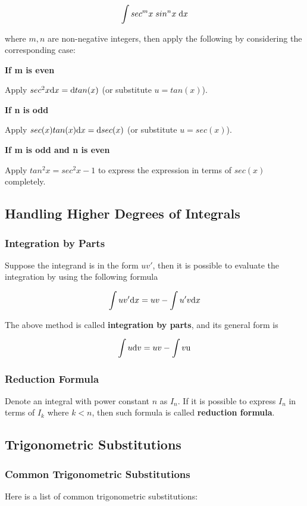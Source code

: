 \documentclass[a4paper,12pt]{article}
\begin{document}
$$\int sec^{m}x\; sin^{n}x\;\mathrm{d} x$$\s

where $m,n$ are non-negative integers, then apply the following by considering the corresponding case:

\begin{alist}
  \item \textbf{If m is even}\n

  Apply $sec^{2}x\mathrm{d} x=\mathrm{d} tan(x)$ (or substitute $u=tan(x)$).

  \item \textbf{If n is odd}\n

  Apply $sec(x)tan(x)\mathrm{d} x=\mathrm{d} sec(x)$ (or substitute $u=sec(x)$).

  \item \textbf{If m is odd and n is even}\n

  Apply $tan^{2}x=sec^{2}x-1$ to express the expression in terms of $sec(x)$ completely.
\end{alist}

\subsection{Handling Higher Degrees of Integrals}
\subsubsection{Integration by Parts}
Suppose the integrand is in the form $uv'$, then it is possible to evaluate the integration by using the following formula

$$\int uv'\mathrm{d} x=uv-\int u'v\mathrm{d} x$$

The above method is called \textbf{integration by parts}, and its general form is

$$\int u\mathrm{d} v=uv-\int v\mathrm{u}$$

\subsubsection{Reduction Formula}
Denote an integral with power constant $n$ as $I_{n}$. If it is possible to express $I_{n}$ in terms of $I_{k}$ where $k<n$, then such formula is called \textbf{reduction formula}.

\subsection{Trigonometric Substitutions}
\subsubsection{Common Trigonometric Substitutions}
Here is a list of common trigonometric substitutions:
\end{document}

